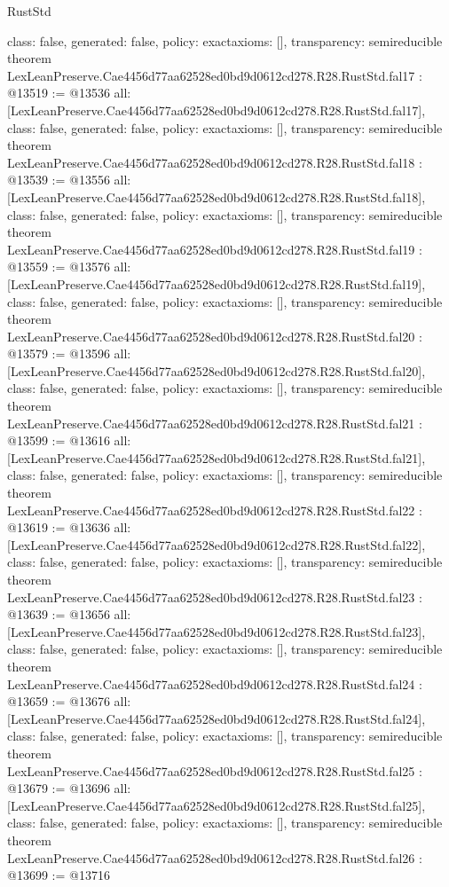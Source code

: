 \begin{lexlean}{RustStd}
\begin{coremodule}
{  class: false,
  generated: false,
  policy: exact{axioms: []},
  transparency: semireducible
}
theorem LexLeanPreserve.Cae4456d77aa62528ed0bd9d0612cd278.R28.RustStd.fal17 : @13519 := @13536 {
  all: [LexLeanPreserve.Cae4456d77aa62528ed0bd9d0612cd278.R28.RustStd.fal17],
  class: false,
  generated: false,
  policy: exact{axioms: []},
  transparency: semireducible
}
theorem LexLeanPreserve.Cae4456d77aa62528ed0bd9d0612cd278.R28.RustStd.fal18 : @13539 := @13556 {
  all: [LexLeanPreserve.Cae4456d77aa62528ed0bd9d0612cd278.R28.RustStd.fal18],
  class: false,
  generated: false,
  policy: exact{axioms: []},
  transparency: semireducible
}
theorem LexLeanPreserve.Cae4456d77aa62528ed0bd9d0612cd278.R28.RustStd.fal19 : @13559 := @13576 {
  all: [LexLeanPreserve.Cae4456d77aa62528ed0bd9d0612cd278.R28.RustStd.fal19],
  class: false,
  generated: false,
  policy: exact{axioms: []},
  transparency: semireducible
}
theorem LexLeanPreserve.Cae4456d77aa62528ed0bd9d0612cd278.R28.RustStd.fal20 : @13579 := @13596 {
  all: [LexLeanPreserve.Cae4456d77aa62528ed0bd9d0612cd278.R28.RustStd.fal20],
  class: false,
  generated: false,
  policy: exact{axioms: []},
  transparency: semireducible
}
theorem LexLeanPreserve.Cae4456d77aa62528ed0bd9d0612cd278.R28.RustStd.fal21 : @13599 := @13616 {
  all: [LexLeanPreserve.Cae4456d77aa62528ed0bd9d0612cd278.R28.RustStd.fal21],
  class: false,
  generated: false,
  policy: exact{axioms: []},
  transparency: semireducible
}
theorem LexLeanPreserve.Cae4456d77aa62528ed0bd9d0612cd278.R28.RustStd.fal22 : @13619 := @13636 {
  all: [LexLeanPreserve.Cae4456d77aa62528ed0bd9d0612cd278.R28.RustStd.fal22],
  class: false,
  generated: false,
  policy: exact{axioms: []},
  transparency: semireducible
}
theorem LexLeanPreserve.Cae4456d77aa62528ed0bd9d0612cd278.R28.RustStd.fal23 : @13639 := @13656 {
  all: [LexLeanPreserve.Cae4456d77aa62528ed0bd9d0612cd278.R28.RustStd.fal23],
  class: false,
  generated: false,
  policy: exact{axioms: []},
  transparency: semireducible
}
theorem LexLeanPreserve.Cae4456d77aa62528ed0bd9d0612cd278.R28.RustStd.fal24 : @13659 := @13676 {
  all: [LexLeanPreserve.Cae4456d77aa62528ed0bd9d0612cd278.R28.RustStd.fal24],
  class: false,
  generated: false,
  policy: exact{axioms: []},
  transparency: semireducible
}
theorem LexLeanPreserve.Cae4456d77aa62528ed0bd9d0612cd278.R28.RustStd.fal25 : @13679 := @13696 {
  all: [LexLeanPreserve.Cae4456d77aa62528ed0bd9d0612cd278.R28.RustStd.fal25],
  class: false,
  generated: false,
  policy: exact{axioms: []},
  transparency: semireducible
}
theorem LexLeanPreserve.Cae4456d77aa62528ed0bd9d0612cd278.R28.RustStd.fal26 : @13699 := @13716 {
}
\end{coremodule}
\end{lexlean}

